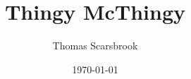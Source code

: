 \documentclass{IEEEtran}
\author{Thomas Scarsbrook}
\title{Thingy McThingy}
\date{\today}
\begin{document}
\maketitle

\abstract{}




\end{document}
